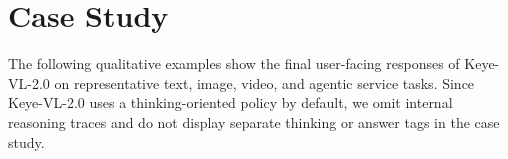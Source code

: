 \newpage
\section{Case Study}

The following qualitative examples show the final user-facing responses of Keye-VL-2.0 on representative text, image, video, and agentic service tasks. Since Keye-VL-2.0 uses a thinking-oriented policy by default, we omit internal reasoning traces and do not display separate thinking or answer tags in the case study.








